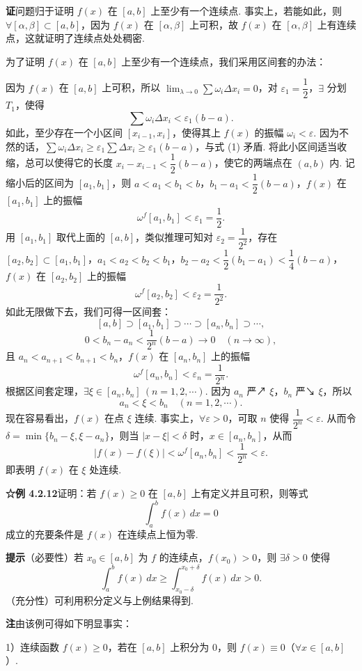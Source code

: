 \documentclass[UTF8,12pt,a4paper,fontset=fandol]{ctexart}
\begin{document}
\noindent\textbf{证}\quad 问题归于证明 $f(x)$ 在 $[a,b]$ 上至少有一个连续点. 事实上，若能如此，则 $\forall[\alpha,\beta]\subset[a,b]$，因为 $f(x)$ 在 $[\alpha,\beta]$ 上可积，故 $f(x)$ 在 $[\alpha,\beta]$ 上有连续点，这就证明了连续点处处稠密.

为了证明 $f(x)$ 在 $[a,b]$ 上至少有一个连续点，我们采用区间套的办法：

因为 $f(x)$ 在 $[a,b]$ 上可积，所以 $\lim_{\lambda\to0}\sum\omega_i\Delta x_i=0$，对 $\varepsilon_1=\dfrac12$，$\exists$ 分划 $T_1$，使得
\[
\sum\omega_i\Delta x_i<\varepsilon_1(b-a).
\tag{1}
\]
如此，至少存在一个小区间 $[x_{i-1},x_i]$，使得其上 $f(x)$ 的振幅 $\omega_i<\varepsilon$. 因为不然的话，$\sum\omega_i\Delta x_i\ge\varepsilon_1\sum\Delta x_i\ge\varepsilon_1(b-a)$，与式 (1) 矛盾. 将此小区间适当收缩，总可以使得它的长度 $x_i-x_{i-1}<\dfrac12(b-a)$，使它的两端点在 $(a,b)$ 内. 记缩小后的区间为 $[a_1,b_1]$，则 $a<a_1<b_1<b$，$b_1-a_1<\dfrac12(b-a)$，$f(x)$ 在 $[a_1,b_1]$ 上的振幅
\[
\omega^f[a_1,b_1]<\varepsilon_1=\frac12.
\]
用 $[a_1,b_1]$ 取代上面的 $[a,b]$，类似推理可知对 $\varepsilon_2=\dfrac1{2^2}$，存在 $[a_2,b_2]\subset[a_1,b_1]$，$a_1<a_2<b_2<b_1$，$b_2-a_2<\dfrac12(b_1-a_1)<\dfrac14(b-a)$，$f(x)$ 在 $[a_2,b_2]$ 上的振幅
\[
\omega^f[a_2,b_2]<\varepsilon_2=\frac1{2^2}.
\]
如此无限做下去，我们可得一区间套：
\[
[a,b]\supset[a_1,b_1]\supset\cdots\supset[a_n,b_n]\supset\cdots,
\]
\[
0<b_n-a_n<\frac1{2^n}(b-a)\to0\quad(n\to\infty),
\]
且 $a_n<a_{n+1}<b_{n+1}<b_n$，$f(x)$ 在 $[a_n,b_n]$ 上的振幅
\[
\omega^f[a_n,b_n]<\varepsilon_n=\frac1{2^n}.
\]
根据区间套定理，$\exists\xi\in[a_n,b_n]\ (n=1,2,\cdots)$. 因为 $a_n$ 严↗ $\xi$，$b_n$ 严↘ $\xi$，所以
\[
a_n<\xi<b_n\quad(n=1,2,\cdots).
\]
现在容易看出，$f(x)$ 在点 $\xi$ 连续. 事实上，$\forall\varepsilon>0$，可取 $n$ 使得 $\dfrac1{2^n}<\varepsilon$. 从而令 $\delta=\min\{b_n-\xi,\xi-a_n\}$，则当 $|x-\xi|<\delta$ 时，$x\in[a_n,b_n]$，从而
\[
|f(x)-f(\xi)|<\omega^f[a_n,b_n]<\frac1{2^n}<\varepsilon.
\]
即表明 $f(x)$ 在 $\xi$ 处连续.

\noindent\textbf{☆例 4.2.12}\quad 证明：若 $f(x)\ge0$ 在 $[a,b]$ 上有定义并且可积，则等式
\[
\int_a^b f(x)\,dx=0
\]
成立的充要条件是 $f(x)$ 在连续点上恒为零.

\noindent\textbf{提示}\quad （必要性）若 $x_0\in[a,b]$ 为 $f$ 的连续点，$f(x_0)>0$，则 $\exists\delta>0$ 使得
\[
\int_a^b f(x)\,dx\ge\int_{x_0-\delta}^{x_0+\delta}f(x)\,dx>0.
\]
（充分性）可利用积分定义与上例结果得到.

\noindent\textbf{注}\quad 由该例可得如下明显事实：

1）连续函数 $f(x)\ge0$，若在 $[a,b]$ 上积分为 0，则 $f(x)\equiv0$（$\forall x\in[a,b]$）.
\end{document}

